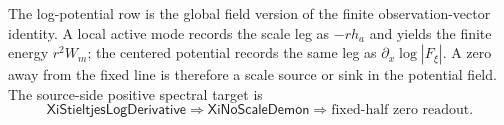 \begin{principle}
\label{prin:rh-log-potential-global-pythagorean-target}
The log-potential row is the global field version of the finite
observation-vector identity.  A local active mode records the scale leg
as $-r h_a$ and yields the finite energy $r^2W_m$; the centered
potential records the same leg as $\partial_x\log|F_\xi|$.  A zero away
from the fixed line is therefore a scale source or sink in the potential
field.  The source-side positive spectral target is
$$
\mathsf{XiStieltjesLogDerivative}
\Longrightarrow
\mathsf{XiNoScaleDemon}
\Longrightarrow
\text{fixed-half zero readout}.
$$
\end{principle}
